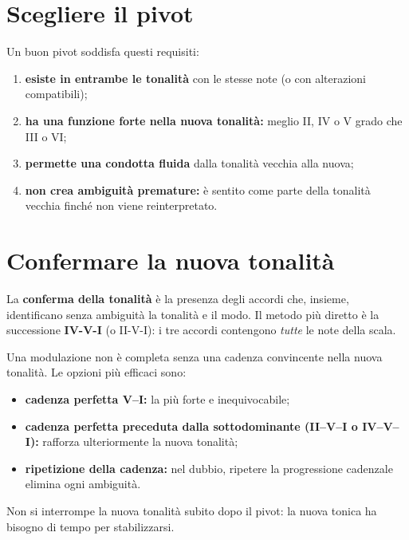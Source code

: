 \section{Scegliere il pivot}
\label{subsec:scelta_pivot}

\begin{regola}
	\label{reg:scelta_pivot}
	Un buon pivot soddisfa questi requisiti:
	\begin{enumerate}
		\item \textbf{esiste in entrambe le tonalità} con le stesse note (o con alterazioni compatibili);
		\item \textbf{ha una funzione forte nella nuova tonalità:} meglio II, IV o V grado che III o VI;
		\item \textbf{permette una condotta fluida} dalla tonalità vecchia alla nuova;
		\item \textbf{non crea ambiguità premature:} è sentito come parte della tonalità vecchia finché non viene reinterpretato.
	\end{enumerate}
\end{regola}

\section{Confermare la nuova tonalità}
\label{subsec:conferma_tonalita}

\begin{definizione}
	\label{def:conferma_tonalita}
	La \textbf{conferma della tonalità} è la presenza degli accordi che, insieme, identificano senza ambiguità la tonalità e il modo. Il metodo più diretto è la successione \textbf{IV-V-I} (o II-V-I): i tre accordi contengono \textit{tutte} le note della scala.
\end{definizione}

\begin{regola}
	\label{reg:conferma_cadenza}
	Una modulazione non è completa senza una cadenza convincente nella nuova tonalità. Le opzioni più efficaci sono:
	\begin{itemize}
		\item \textbf{cadenza perfetta V--I:} la più forte e inequivocabile;
		\item \textbf{cadenza perfetta preceduta dalla sottodominante (II--V--I o IV--V--I):} rafforza ulteriormente la nuova tonalità;
		\item \textbf{ripetizione della cadenza:} nel dubbio, ripetere la progressione cadenzale elimina ogni ambiguità.
	\end{itemize}
	Non si interrompe la nuova tonalità subito dopo il pivot: la nuova tonica ha bisogno di tempo per stabilizzarsi.
\end{regola}


